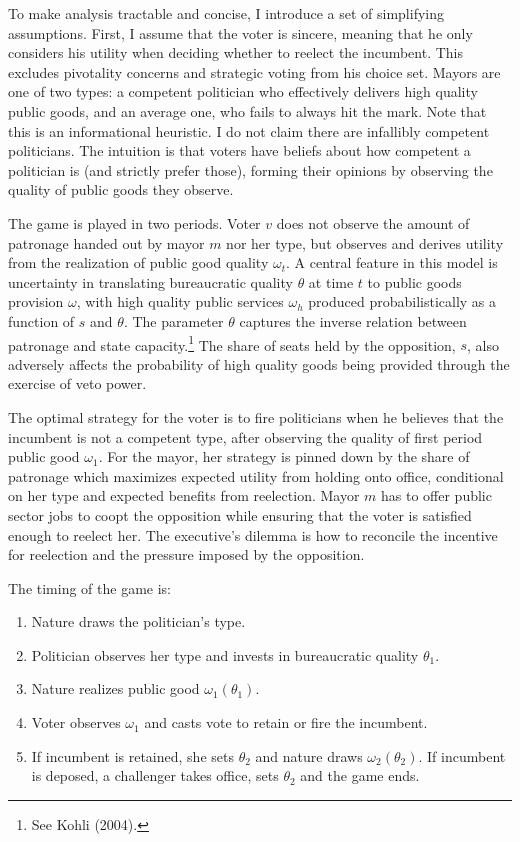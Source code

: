 \documentclass[12pt,]{article}
\providecommand{\tightlist}{%
  \setlength{\itemsep}{0pt}\setlength{\parskip}{0pt}}
\let\rmarkdownfootnote\footnote%
\def\footnote{\protect\rmarkdownfootnote}
\begin{document}
To make analysis tractable and concise, I introduce a set of simplifying
assumptions. First, I assume that the voter is sincere, meaning that he
only considers his utility when deciding whether to reelect the
incumbent. This excludes pivotality concerns and strategic voting from
his choice set. Mayors are one of two types: a competent politician who
effectively delivers high quality public goods, and an average one, who
fails to always hit the mark. Note that this is an informational
heuristic. I do not claim there are infallibly competent politicians.
The intuition is that voters have beliefs about how competent a
politician is (and strictly prefer those), forming their opinions by
observing the quality of public goods they observe.

The game is played in two periods. Voter \(v\) does not observe the
amount of patronage handed out by mayor \(m\) nor her type, but observes
and derives utility from the realization of public good quality
\(\omega_t\). A central feature in this model is uncertainty in
translating bureaucratic quality \(\theta\) at time \(t\) to public
goods provision \(\omega\), with high quality public services
\(\omega_{h}\) produced probabilistically as a function of \(s\) and
\(\theta\). The parameter \(\theta\) captures the inverse relation
between patronage and state capacity.\footnote{See Kohli (2004).} The
share of seats held by the opposition, \(s\), also adversely affects the
probability of high quality goods being provided through the exercise of
veto power.

The optimal strategy for the voter is to fire politicians when he
believes that the incumbent is not a competent type, after observing the
quality of first period public good \(\omega_1\). For the mayor, her
strategy is pinned down by the share of patronage which maximizes
expected utility from holding onto office, conditional on her type and
expected benefits from reelection. Mayor \(m\) has to offer public
sector jobs to coopt the opposition while ensuring that the voter is
satisfied enough to reelect her. The executive's dilemma is how to
reconcile the incentive for reelection and the pressure imposed by the
opposition.

The timing of the game is:

\begin{enumerate}
\def\labelenumi{\arabic{enumi})}
\tightlist
\item
  Nature draws the politician's type.
\item
  Politician observes her type and invests in bureaucratic quality
  \(\theta_1\).
\item
  Nature realizes public good \(\omega_1(\theta_1)\).
\item
  Voter observes \(\omega_1\) and casts vote to retain or fire the
  incumbent.
\item
  If incumbent is retained, she sets \(\theta_2\) and nature draws
  \(\omega_2(\theta_2)\). If incumbent is deposed, a challenger takes
  office, sets \(\theta_2\) and the game ends.
\end{enumerate}
\end{document}
